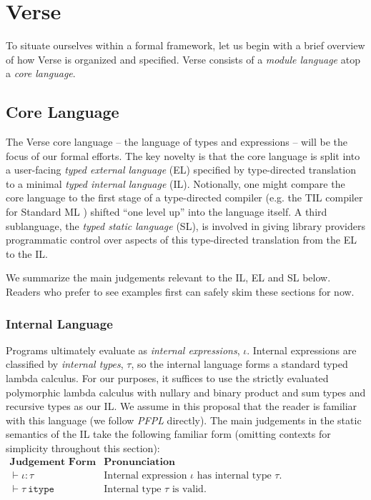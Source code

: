 \section{Verse}\label{sec:verse}
To situate ourselves within a formal framework, let us begin with a brief overview of how Verse is organized and specified. Verse consists of a \emph{module language} atop a \emph{core language}. 

\subsection{Core Language}
The Verse core language -- the language of types and expressions -- will be the focus of our formal efforts. The key novelty is that the core language is split into a user-facing \emph{typed external language} (EL) specified by type-directed translation to a minimal \emph{typed internal language} (IL). Notionally, one might compare the core language to the first stage of a type-directed compiler (e.g. the TIL compiler for Standard ML \cite{tarditi+:til-OLD}) shifted ``one level up'' into the language itself. A third sublanguage, the \emph{typed static language} (SL), is involved in giving library providers programmatic control over aspects of this type-directed translation from the EL to the IL. %

We summarize the main judgements relevant to the IL, EL and SL below. Readers who prefer to see examples first can safely skim these sections for now.

\subsubsection{Internal Language}
Programs ultimately evaluate as \emph{internal expressions}, $\iota$. Internal expressions are classified by \emph{internal types}, $\tau$, so the internal language forms a standard typed lambda calculus. For our purposes, it suffices to use the strictly evaluated polymorphic lambda calculus with nullary and binary product and sum types and recursive types as our IL. We assume in this proposal that the reader is familiar with this language (we follow \emph{PFPL} \cite{pfpl} directly). The main judgements in the static semantics of the IL take the following familiar form (omitting contexts for simplicity throughout this section):
\\[1ex]
$
\begin{array}{ll}
\textbf{Judgement Form} & \textbf{Pronunciation}\\
\vdash \iota : \tau & \text{Internal expression $\iota$ has internal type $\tau$.}\\
\vdash \tau~\mathtt{itype} & \text{Internal type $\tau$ is valid.}
\end{array}
$\\

